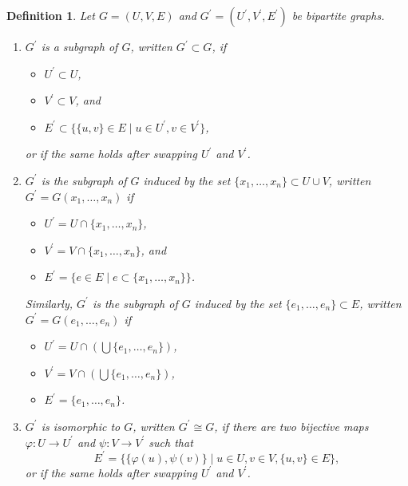 \documentclass[a4paper]{amsart}
\newtheorem{definition}[thm]{Definition}
\begin{document}
\begin{definition}
    \label{bga::def:bipartite_graph_operations}
    Let $G = (U, V, E)$ and $G^\prime = (U^\prime, V^\prime, E^\prime)$ be bipartite graphs.
    \begin{enumerate}
        \item $G^\prime$ is a subgraph of $G$, written $G^\prime \subset G$, if 
        \begin{itemize}
            \item $U^\prime \subset U$,
            \item $V^\prime \subset V$, and 
            \item $E^\prime \subset \{\{u, v\} \in E\mid u \in U^\prime, v \in V^\prime\}$,
        \end{itemize}
        or if the same holds after swapping $U^\prime$ and $V^\prime$.
        \item $G^\prime$ is the subgraph of $G$ induced by the set $\{x_1, \dots, x_n\} \subset U \cup V$, written $G^\prime = G(x_1, \dots, x_n)$ if
        \begin{itemize}
            \item $U^\prime = U \cap \{x_1, \dots, x_n\}$,
            \item $V^\prime = V \cap \{x_1, \dots, x_n\}$, and
            \item $E^\prime = \{e \in E\mid e \subset \{x_1, \dots, x_n\}\}$.
        \end{itemize}
        Similarly, $G^\prime$ is the subgraph of $G$ induced by the set $\{e_1, \dots, e_n\} \subset E$, written $G^\prime = G(e_1, \dots, e_n)$ if
        \begin{itemize}
            \item $U^\prime = U \cap \left( \bigcup \{e_1, \dots, e_n\} \right)$,
            \item $V^\prime = V \cap \left( \bigcup \{e_1, \dots, e_n\} \right)$,
            \item $E^\prime = \{e_1, \dots, e_n\}$.
        \end{itemize}
        \item $G^\prime$ is isomorphic to $G$, written $G^\prime \cong G$, if there are two bijective maps $\varphi: U \to U^\prime$ and $\psi: V \to V^\prime$ such that 
        $$ E^\prime = \{\{\varphi(u), \psi(v)\}\mid u \in U, v \in V, \{u, v\} \in E\}, $$
        or if the same holds after swapping $U^\prime$ and $V^\prime$.
    \end{enumerate}
\end{definition}
\end{document}
